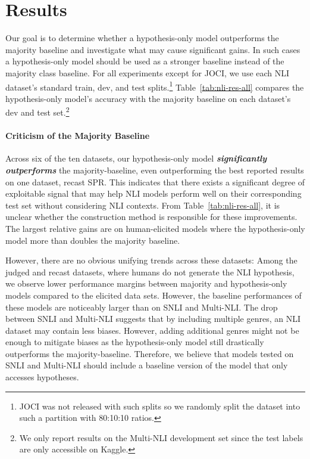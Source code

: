 \section{Results}
Our goal is to determine whether a hypothesis-only model outperforms the majority baseline and investigate what may cause significant gains. In such cases a hypothesis-only model should be used as a stronger baseline instead of the majority class baseline. For all experiments except for JOCI, we use each NLI dataset's standard train, dev, and test
splits.\footnote{JOCI was not released with such splits so we randomly split the dataset into such a partition with 80:10:10 ratios.}
Table~\ref{tab:nli-res-all} compares the hypothesis-only model's accuracy with the majority baseline on each dataset's dev and test set.\footnote{We only report results on the Multi-NLI development set since the test labels are only accessible on Kaggle.}

\paragraph{Criticism of the Majority Baseline} Across six of the ten datasets, our hypothesis-only model \textit{\textbf{significantly outperforms}} the majority-baseline, even outperforming the best reported results on one dataset, recast SPR.  This indicates that there exists a significant degree of exploitable signal that may help NLI models perform well on their corresponding test set without considering NLI contexts.  From Table~\ref{tab:nli-res-all}, it is unclear whether the construction method is responsible for these improvements. The largest relative gains are on human-elicited models where the hypothesis-only model more than doubles the majority baseline.

However, there are no obvious unifying trends across these datasets:  Among the judged and recast datasets, where humans do not generate the NLI hypothesis, we observe lower performance margins between majority and hypothesis-only models compared to the elicited data sets.  However, the baseline performances of these models are noticeably larger than on SNLI and Multi-NLI.  The drop between SNLI and Multi-NLI suggests that by including multiple genres, an NLI dataset may contain less biases. However, adding additional genres might not be enough to mitigate biases as the hypothesis-only model still drastically outperforms the majority-baseline. Therefore, we believe that models tested on SNLI and Multi-NLI should include a baseline version of the model that only accesses hypotheses. 

